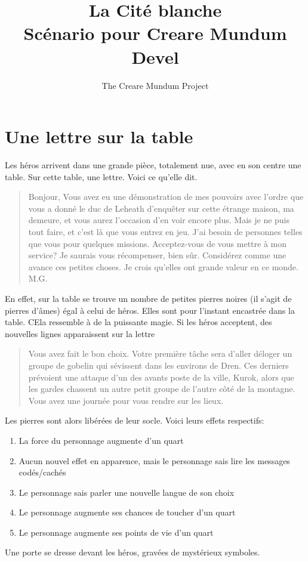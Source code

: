 \documentclass{book}
\title{La Cité blanche \\ Scénario pour Creare Mundum \\ Devel}
\author{The Creare Mundum Project}
\date{\oldstylenums{\insertdate}}
\begin{document}
\maketitle
\setcounter{tocdepth}{2} %
\renewcommand{\contentsname}{Sommaire} 
\tableofcontents

\section{Une lettre sur la table}
Les héros arrivent dans une grande pièce, totalement nue, avec en son centre une table. Sur cette table, une lettre. Voici ce qu'elle dit.
\begin{quotation}
Bonjour,
\newline
Vous avez eu une démonstration de mes pouvoirs avec l'ordre que vous a donné le duc de Leheath d’enquêter sur cette étrange maison, ma demeure, et vous aurez l'occasion d'en voir encore plus. Mais je ne puis tout faire, et c'est là que vous entrez en jeu. J'ai besoin de personnes telles que vous pour quelques missions. Acceptez-vous de vous mettre à mon service?
\newline
Je saurais vous récompenser, bien sûr. Considérez comme une avance ces petites choses. Je crois qu'elles ont grande valeur en ce monde.
\newline
M.G.
\end{quotation}
En effet, sur la table se trouve un nombre de petites pierres noires (il s'agit de pierres d'âmes) égal à celui de héros. Elles sont pour l'instant encastrée dans la table. CEla ressemble à de la puissante magie. Si les héros acceptent, des nouvelles lignes apparaissent sur la lettre
\begin{quotation}
Vous  avez fait le bon choix. Votre première tâche sera d'aller déloger un groupe de gobelin qui sévissent dans les environs de Dren. Ces derniers prévoient une attaque d'un des avants poste de la ville, Kurok, alors que les gardes chassent un autre petit groupe de l'autre côté de la montagne. Vous avez une journée pour vous rendre sur les lieux.
\end{quotation}
Les pierres sont alors libérées de leur socle. Voici leurs effets respectifs:
\begin{enumerate}
\item La force du personnage augmente d'un quart
\item Aucun nouvel effet en apparence, mais le personnage sais lire les messages codés/cachés
\item Le personnage sais parler une nouvelle langue de son choix
\item Le personnage augmente ses chances de toucher d'un quart
\item Le personnage augmente ses points de vie d'un quart
\end{enumerate}
Une porte se dresse devant les héros, gravées de mystérieux symboles.
\end{document}

